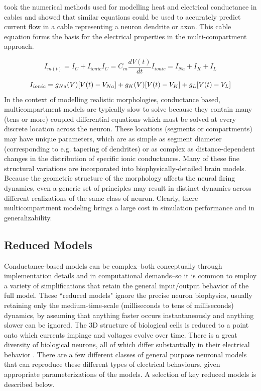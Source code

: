\cite{rall1962electrophysiology} took the numerical methods used for modelling heat and electrical conductance in cables and showed that similar equations could be used to accurately predict current flow in a cable representing a neuron dendrite or axon.
This cable equation forms the basis for the electrical properties in the multi-compartment approach.
\\
\begin{center}
\begin{equation}
I_{m(t)}=I_{C}+I_{ionic} 
I_{C}=C_{m}\frac{dV(t)}{dt} 
I_{ionic}=I_{Na}+I_{K}+I_{L}
\end{equation}
\end{center}
\begin{equation}
I_{ionic}=\\
g_{Na}(V)[V(t)-V_{Na}]+\\
g_{K}(V)[V(t)-V_{K}]+\\g_{L}[V(t)-V_{L}] 
\end{equation}
In the context of modelling realistic morphologies, conductance based, multicompartment models are typically slow to solve because they contain many (tens or more) coupled differential equations which must be solved at every discrete location across the neuron.
These locations (segments or compartments) may have unique parameters, which are as simple as segment diameter (corresponding to e.g. tapering of dendrites) or as complex as distance-dependent changes in the distribution of specific ionic conductances.
Many of these fine structural variations are incorporated into biophysically-detailed brain models.  
Because the geometric structure of the morphology affects the neural firing dynamics, even a generic set of principles may result in distinct dynamics across different realizations of the same class of neuron.  
Clearly, there multicompartment modeling brings a large cost in simulation performance and in generalizability.

\subsection{Reduced Models}
Conductance-based models can be complex--both conceptually through implementation details and in computational demands--so it is common to employ a variety of simplifications that retain the general input/output behavior of the full model.
These ``reduced models" ignore the precise neuron biophysics, usually retaining only the medium-time-scale (milliseconds to tens of milliseconds) dynamics, by assuming that anything faster occurs instantaneously and anything slower can be ignored.
The 3D structure of biological cells is reduced to a point onto which currents impinge and voltages evolve over time. There is a great diversity of biological neurons, all of which differ substantially in their electrical behavior \citep{quadrato2017cell}. There are a few different classes of general purpose neuronal models that can reproduce these different types of electrical behaviours, given appropriate parameterizations of the models. A selection of key reduced models is described below.
